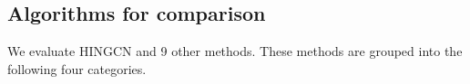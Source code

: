\subsection{Algorithms for comparison}
\label{sec:algo-comp}
We evaluate HINGCN and 9 other methods.
These methods are grouped into the following four categories.
%
%

%
%
%


